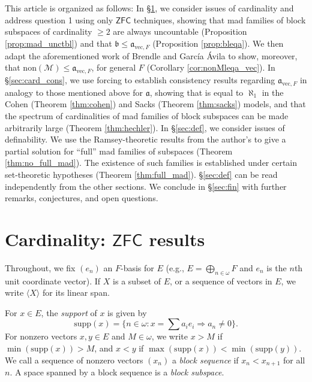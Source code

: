 \documentclass[11pt]{amsart}
\newcommand{\LM}{\mathcal{M}}
\renewcommand{\b}{\mathfrak{b}}
\renewcommand{\a}{\mathfrak{a}}
\theoremstyle{definition}
\theoremstyle{remark}
\newcommand{\supp}{\mathrm{supp}}
\newcommand{\ZFC}{\mathsf{ZFC}}
\renewcommand{\1}{\mathbf{1}}
\begin{document}

This article is organized as follows: In \S\ref{sec:card_ZFC}, we consider issues of cardinality and address question 1 using only $\ZFC$ techniques, showing that mad families of block subspaces of cardinality $\geq 2$ are always uncountable (Proposition \ref{prop:mad_unctbl}) and that $\b\leq \a_{\mathrm{vec},F}$ (Proposition \ref{prop:bleqa}). We then adapt the aforementioned work of Brendle and Garc\'{i}a \'{A}vila to show, moreover, that $\mathrm{non}(\LM)\leq\a_{\mathrm{vec},F}$, for general $F$ (Corollary \ref{cor:nonMleqa_vec}). In \S\ref{sec:card_cons}, we use forcing to establish consistency results regarding $\a_{\mathrm{vec},F}$ in analogy to those mentioned above for $\a$, showing that is equal to $\aleph_1$ in the Cohen (Theorem \ref{thm:cohen}) and Sacks (Theorem \ref{thm:sacks}) models, and that the spectrum of cardinalities of mad families of block subspaces can be made arbitrarily large (Theorem \ref{thm:hechler}). In \S\ref{sec:def}, we consider issues of definability. We use the Ramsey-theoretic results from the author's \cite{MR3864398} to give a partial solution for ``full'' mad families of subspaces (Theorem \ref{thm:no_full_mad}). The existence of such families is established under certain set-theoretic hypotheses (Theorem \ref{thm:full_mad}). \S\ref{sec:def} can be read independently from the other sections. We conclude in \S\ref{sec:fin} with further remarks, conjectures, and open questions.




\section{Cardinality: $\ZFC$ results}\label{sec:card_ZFC}

Throughout, we fix $(e_n)$ an $F$-basis for $E$ (e.g., $E=\bigoplus_{n\in\omega} F$ and $e_n$ is the $n$th unit coordinate vector). If $X$ is a subset of $E$, or a sequence of vectors in $E$, we write $\langle X\rangle$ for its linear span. 

For $x\in E$, the \emph{support} of $x$ is given by
\[
	\supp(x) = \{n\in\omega:x=\sum a_ie_i \Rightarrow a_n\neq 0\}.
\]
For nonzero vectors $x,y\in E$ and $M\in\omega$, we write $x>M$ if $\min(\supp(x))>M$, and $x<y$ if $\max(\supp(x))<\min(\supp(y))$. We call a sequence of nonzero vectors $(x_n)$ a \emph{block sequence} if $x_n<x_{n+1}$ for all $n$. A space spanned by a block sequence is a \emph{block subspace}. 
\end{document}
